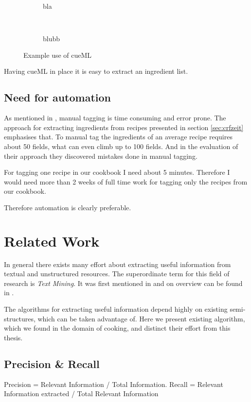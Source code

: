 \documentclass[12pt, twoside]{report}
\begin{document}
\begin{figure}
	\begin{subfigure}{1\textwidth}
		\centering
		\caption{bla}
	\end{subfigure} \\
	\begin{subfigure}{1\textwidth}
		\centering
		\caption{blubb }
	\end{subfigure}
	\caption{Example use of cueML}
	\label{fig:exampleCueML}
\end{figure} 

Having cueML in place it is easy to extract an ingredient list. 




\section{Need for automation}
As mentioned in \parencite{manualTagging}, manual tagging is time consuming and error prone. The approach for extracting ingredients from recipes presented in section \ref{sec:crfzeit} emphasises that. To manual tag the ingredients of an average recipe requires about 50 fields, what can even climb up to 100 fields. And in the evaluation of their approach they discovered mistakes done in manual tagging.

For tagging one recipe in our cookbook I need about 5 minutes. Therefore I would need more than 2 weeks of full time work for tagging only the recipes from our cookbook.

Therefore automation is clearly preferable.

\chapter{Related Work}
In general there exists many effort about extracting useful information from textual and unstructured resources. The superordinate term for this field of research is \textit{Text Mining}. It was first mentioned in \parencite{KDT} and on overview can be found in \parencite{surveyOfTextMining}. 

The algorithms for extracting useful information depend highly on existing semi-structures, which can be taken advantage of. Here we present existing algorithm, which we found in the domain of cooking, and distinct their effort from this thesis.

\section{Precision \& Recall}
Precision = Relevant Information / Total Information.
Recall = Relevant Information extracted / Total Relevant Information
\end{document}
